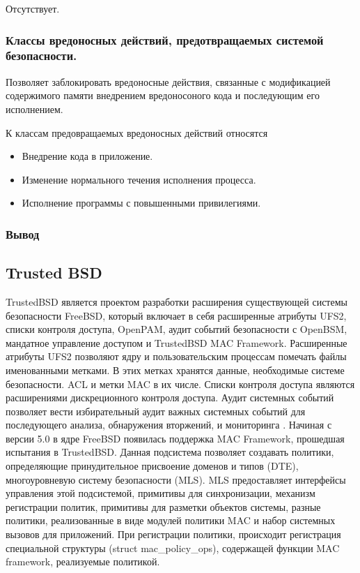 Отсутствует. 

\subsubsection{Классы вредоносных действий, предотвращаемых 
	системой безопасности.} 

Позволяет заблокировать вредоносные действия, связанные 
с модификацией содержимого памяти внедрением вредоносоного 
кода и последующим его исполнением. 

К классам предовращаемых вредоносных действий относятся 
\begin{itemize} 
\item Внедрение кода в приложение. 
\item Изменение нормального течения исполнения процесса. 
\item Исполнение программы с повышенными привилегиями. 
\end{itemize} 

\subsubsection{Вывод}

\bigskip
\subsection{Trusted BSD} 

TrustedBSD является проектом разработки 
расширения существующей системы 
безопасности FreeBSD, который включает 
в себя  расширенные атрибуты UFS2, 
списки контроля доступа, OpenPAM, аудит событий 
безопасности с OpenBSM, мандатное управление доступом 
и TrustedBSD MAC Framework. 
Расширенные атрибуты UFS2 позволяют ядру и 
пользовательским процессам помечать файлы 
именованными метками. В этих метках
хранятся данные, необходимые системе безопасности. 
ACL и метки MAC в их числе. Списки контроля доступа являются 
 расширениями дискреционного контроля доступа. Аудит 
системных событий позволяет вести избирательный 
аудит важных системных событий для последующего 
анализа, обнаружения вторжений, и мониторинга  
. Начиная с версии 5.0 в ядре FreeBSD 
появилась поддержка MAC Framework, прошедшая испытания 
в TrustedBSD. Данная подсистема позволяет создавать политики, 
определяющие принудительное присвоение доменов и типов (DTE), 
многоуровневую систему безопасности (MLS). MLS  
предоставляет интерфейсы управления этой подсистемой, примитивы 
для синхронизации, механизм регистрации политик, примитивы 
для разметки объектов системы, разные политики, 
реализованные в виде модулей политики MAC и набор 
системных вызовов для приложений. При регистрации 
политики, происходит регистрация специальной структуры 
(struct mac\_policy\_ops), содержащей функции MAC 
framework, реализуемые политикой. 

